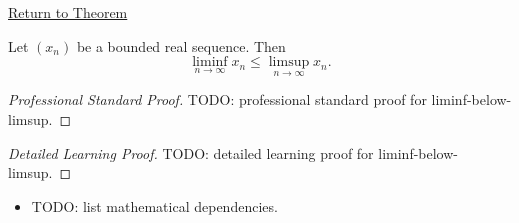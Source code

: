 \newpage
{}
\label{prf:liminf-below-limsup}

\begin{remark*}[Return]
\hyperref[thm:liminf-below-limsup]{Return to Theorem}
\end{remark*}

\begin{theorem*}
Let $(x_n)$ be a bounded real sequence. Then
\[
  \liminf_{n\to\infty}x_n\le \limsup_{n\to\infty}x_n.
\]

\smallskip
\noindent
\end{theorem*}

\begin{proof}[Professional Standard Proof]
\LRAProofBodyStart
TODO: professional standard proof for liminf-below-limsup.
\end{proof}

\begin{proof}[Detailed Learning Proof]
\LRAProofBodyStart
TODO: detailed learning proof for liminf-below-limsup.
\end{proof}

\begin{remark*}
\end{remark*}

\begin{dependencies}
\begin{itemize}
  \item TODO: list mathematical dependencies.
\end{itemize}
\end{dependencies}

\clearpage
